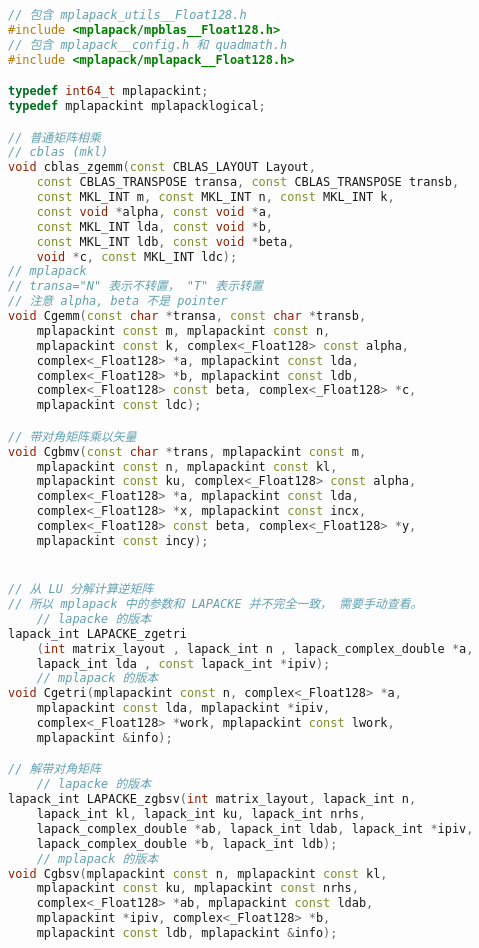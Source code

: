 \begin{lstlisting}[language=cpp]
// 包含 mplapack_utils__Float128.h
#include <mplapack/mpblas__Float128.h>
// 包含 mplapack__config.h 和 quadmath.h
#include <mplapack/mplapack__Float128.h>

typedef int64_t mplapackint;
typedef mplapackint mplapacklogical;

// 普通矩阵相乘
// cblas (mkl)
void cblas_zgemm(const CBLAS_LAYOUT Layout,
    const CBLAS_TRANSPOSE transa, const CBLAS_TRANSPOSE transb,
    const MKL_INT m, const MKL_INT n, const MKL_INT k,
    const void *alpha, const void *a,
    const MKL_INT lda, const void *b,
    const MKL_INT ldb, const void *beta,
    void *c, const MKL_INT ldc);
// mplapack
// transa="N" 表示不转置， "T" 表示转置
// 注意 alpha, beta 不是 pointer
void Cgemm(const char *transa, const char *transb,
    mplapackint const m, mplapackint const n,
    mplapackint const k, complex<_Float128> const alpha,
    complex<_Float128> *a, mplapackint const lda,
    complex<_Float128> *b, mplapackint const ldb,
    complex<_Float128> const beta, complex<_Float128> *c,
    mplapackint const ldc);

// 带对角矩阵乘以矢量
void Cgbmv(const char *trans, mplapackint const m,
    mplapackint const n, mplapackint const kl,
    mplapackint const ku, complex<_Float128> const alpha,
    complex<_Float128> *a, mplapackint const lda,
    complex<_Float128> *x, mplapackint const incx,
    complex<_Float128> const beta, complex<_Float128> *y,
    mplapackint const incy);


// 从 LU 分解计算逆矩阵
// 所以 mplapack 中的参数和 LAPACKE 并不完全一致， 需要手动查看。
    // lapacke 的版本
lapack_int LAPACKE_zgetri
    (int matrix_layout , lapack_int n , lapack_complex_double *a,
    lapack_int lda , const lapack_int *ipiv);
    // mplapack 的版本
void Cgetri(mplapackint const n, complex<_Float128> *a,
    mplapackint const lda, mplapackint *ipiv,
    complex<_Float128> *work, mplapackint const lwork,
    mplapackint &info);

// 解带对角矩阵
    // lapacke 的版本
lapack_int LAPACKE_zgbsv(int matrix_layout, lapack_int n,
    lapack_int kl, lapack_int ku, lapack_int nrhs,
    lapack_complex_double *ab, lapack_int ldab, lapack_int *ipiv,
    lapack_complex_double *b, lapack_int ldb);
    // mplapack 的版本
void Cgbsv(mplapackint const n, mplapackint const kl,
    mplapackint const ku, mplapackint const nrhs,
    complex<_Float128> *ab, mplapackint const ldab,
    mplapackint *ipiv, complex<_Float128> *b,
    mplapackint const ldb, mplapackint &info);
\end{lstlisting}
